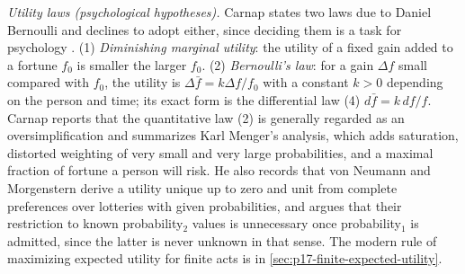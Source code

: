 \emph{Utility laws (psychological hypotheses).} Carnap states two laws
due to Daniel Bernoulli and declines to adopt either, since deciding
them is a task for psychology \cite[sec.~51A--C, pp.~266--273]{Carnap1950Probability}.
(1) \emph{Diminishing marginal utility}: the utility of a fixed gain
added to a fortune \(f_0\) is smaller the larger \(f_0\). (2)
\emph{Bernoulli's law}: for a gain \(\Delta f\) small compared with
\(f_0\), the utility is \(\Delta\bar f=k\Delta f/f_0\) with a constant
\(k>0\) depending on the person and time; its exact form is the
differential law (4) \(d\bar f=k\,df/f\). Carnap reports that the
quantitative law (2) is generally regarded as an oversimplification and
summarizes Karl Menger's analysis, which adds saturation, distorted
weighting of very small and very large probabilities, and a maximal
fraction of fortune a person will risk. He also records that von
Neumann and Morgenstern derive a utility unique up to zero and unit from
complete preferences over lotteries with given probabilities, and argues
that their restriction to known probability\(_2\) values is unnecessary
once probability\(_1\) is admitted, since the latter is never unknown in
that sense. The modern rule of maximizing expected utility for finite
acts is in \cref{sec:p17-finite-expected-utility}.

